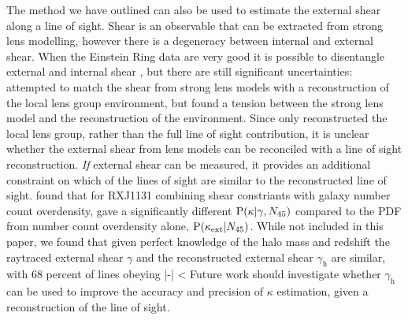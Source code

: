 \documentclass[useAMS,usenatbib]{mn2e}
\begin{document}
The method we have outlined can also be used to estimate the external shear
along a line of sight. Shear is an observable that can be extracted from
strong lens modelling, however there is a degeneracy between internal and
external shear. When the Einstein Ring data are very good it is possible to
disentangle external and internal shear \citep[\eg][]{xxx}, but there are
still significant uncertainties: \citet{WongEtal2011} attempted to match the
shear from strong lens models with a reconstruction of the local lens group
environment, but found a tension between the strong lens model and the
reconstruction of the environment. Since \citet{WongEtal2011} only
reconstructed the local lens group, rather than the full line of sight
contribution, it is unclear whether the external shear from lens models can be
reconciled with a line of sight reconstruction. {\it If} external shear can be
measured, it provides an additional constraint on which of the \MS lines of
sight are similar to the reconstructed line of sight. \citet{SuyuEtal2012}
found that for RXJ1131 combining shear constriants with galaxy number count
overdensity, gave a significantly different ${\rm P}(\kappa|\gamma,N_{45})$
compared to the PDF from number count overdensity alone,
${\rm P}(\kappa_{\rm ext}|N_{45})$. While not included in this paper, we found that given
perfect knowledge of the halo mass and redshift the raytraced external shear
$\gamma$ and the reconstructed external shear $\gamma_{\mathrm{h}}$  are
similar, with 68 percent of lines obeying
\be
\label{eq:shearineq}
|{\boldmath{\gamma}-}| < 
\ee 
Future work should investigate whether $\gamma_{\mathrm{h}}$ can be used
to improve the accuracy and precision of $\kappa$ estimation, given a
reconstruction of the line of sight. 
\end{document}
